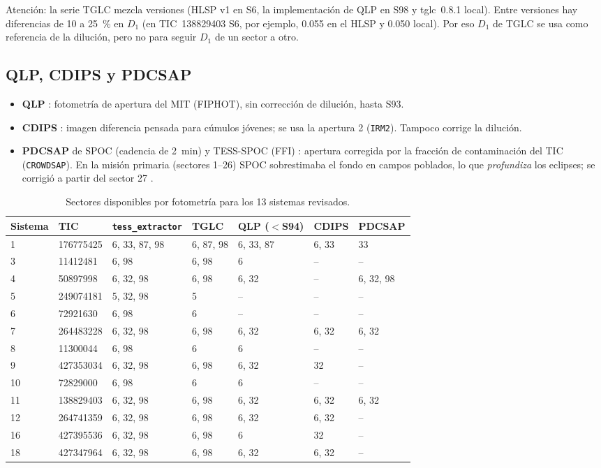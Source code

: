 \documentclass[11pt,a4paper]{article}
\newcommand{\tx}{\texttt{tess\_extractor}}
\begin{document}
Atención: la serie TGLC mezcla versiones (HLSP v1 en S6, la implementación de QLP en S98 y tglc~0.8.1
local). Entre versiones hay diferencias de 10 a 25~\% en $D_1$ (en TIC~138829403 S6, por ejemplo, 0.055
en el HLSP y 0.050 local). Por eso $D_1$ de TGLC se usa como referencia de la dilución, pero no para
seguir $D_1$ de un sector a otro.

\subsection{QLP, CDIPS y PDCSAP}
\begin{itemize}
\item \textbf{QLP} \citep{Huang2020,Kunimoto2021}: fotometría de apertura del MIT (FIPHOT), sin
  corrección de dilución, hasta S93.
\item \textbf{CDIPS} \citep{Bouma2019}: imagen diferencia pensada para cúmulos jóvenes; se usa la
  apertura 2 (\texttt{IRM2}). Tampoco corrige la dilución.
\item \textbf{PDCSAP} de SPOC (cadencia de 2~min) y TESS-SPOC (FFI) \citep{Jenkins2016,Caldwell2020}:
  apertura corregida por la fracción de contaminación del TIC (\texttt{CROWDSAP}). En la misión
  primaria (sectores 1--26) SPOC sobrestimaba el fondo en campos poblados, lo que \emph{profundiza} los
  eclipses; se corrigió a partir del sector 27 \citep{Burt2020}.
\end{itemize}

\begin{table}[H]
\centering
\caption{Sectores disponibles por fotometría para los 13 sistemas revisados.}
\label{tab:disponibles}
\small
\begin{tabular}{lllllll}
\toprule
Sistema & TIC & \tx & TGLC & QLP ($<$S94) & CDIPS & PDCSAP \\
\midrule
1  & 176775425 & 6, 33, 87, 98 & 6, 87, 98 & 6, 33, 87 & 6, 33 & 33 \\
3  & 11412481  & 6, 98 & 6, 98 & 6 & -- & -- \\
4  & 50897998  & 6, 32, 98 & 6, 98 & 6, 32 & -- & 6, 32, 98 \\
5  & 249074181 & 5, 32, 98 & 5 & -- & -- & -- \\
6  & 72921630  & 6, 98 & 6 & -- & -- & -- \\
7  & 264483228 & 6, 32, 98 & 6, 98 & 6, 32 & 6, 32 & 6, 32 \\
8  & 11300044  & 6, 98 & 6 & 6 & -- & -- \\
9  & 427353034 & 6, 32, 98 & 6, 98 & 6, 32 & 32 & -- \\
10 & 72829000  & 6, 98 & 6 & 6 & -- & -- \\
11 & 138829403 & 6, 32, 98 & 6, 98 & 6, 32 & 6, 32 & 6, 32 \\
12 & 264741359 & 6, 32, 98 & 6, 98 & 6, 32 & 6, 32 & -- \\
16 & 427395536 & 6, 32, 98 & 6, 98 & 6 & 32 & -- \\
18 & 427347964 & 6, 32, 98 & 6, 98 & 6, 32 & 6, 32 & -- \\
\bottomrule
\end{tabular}
\end{table}
\end{document}
